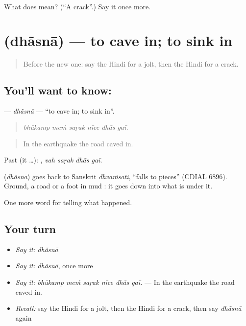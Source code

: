 \begin{tcolorbox}[breakable,colback=teal!4,colframe=teal!35!black,title={Before you move on}]
What does  mean? (\textquotedblleft{}A crack\textquotedblright{}.) Say it once more.
\end{tcolorbox}
\section[\texorpdfstring{\hi{धँसना} (dhãsnā)}{धँसना (dhãsnā)}]{ (dhãsnā) — to cave in; to sink in}

\label{lesson:HI-C303-dhasna}



\begin{quote}
Before the new one: say the Hindi for a jolt, then the Hindi for a crack.
\end{quote}

\subsection*{You'll want to know: }
\textbf{} — \emph{dhãsnā} — \textquotedblleft{}to cave in; to sink in\textquotedblright{}.

\begin{quote}
     
\end{quote}

\begin{quote}
\emph{bhūkamp meṁ saṛak nīce dhãs gaī.}
\end{quote}

\begin{quote}
In the earthquake the road caved in.
\end{quote}

Past (it …):    , \emph{vah saṛak dhãs gaī}.

\begin{cousinweb}
\textbf{} (\emph{dhãsnā}) goes back to Sanskrit \emph{dhvaṁsati}, \textquotedblleft{}falls to pieces\textquotedblright{} (CDIAL 6896). Ground, a road or a foot in mud \textbf{ }: it goes down into what is under it.
\end{cousinweb}

\begin{grammarlens}[title={What you've built}]
One more word for telling what happened.
\end{grammarlens}

\subsection*{Your turn}
\begin{itemize}
\raggedright
  \item \emph{Say it:} \emph{dhãsnā}
  \item \emph{Say it:} \emph{dhãsnā}, once more
  \item \emph{Say it:} \emph{bhūkamp meṁ saṛak nīce dhãs gaī.} — In the earthquake the road caved in.
  \item \emph{Recall:} say the Hindi for a jolt, then the Hindi for a crack, then say \emph{dhãsnā} again
\end{itemize}

